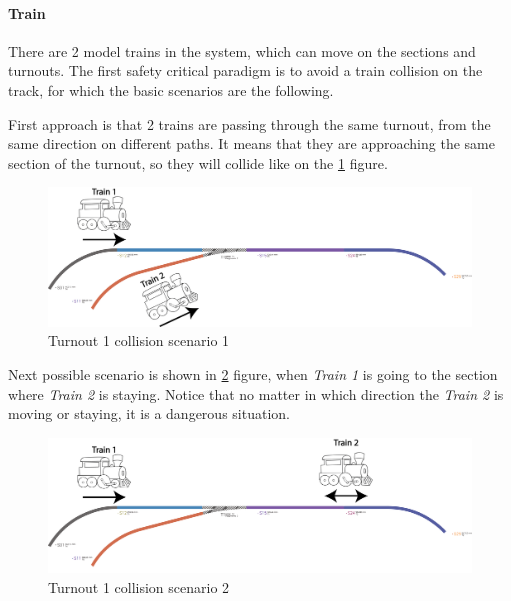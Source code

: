 \paragraph{Train} \label{par:trainScenarios}
There are 2 model trains in the system, which can move on the sections and turnouts. The first safety critical paradigm is to avoid a train collision on the track, for which the basic scenarios are the following. 


First approach is that 2 trains are passing through the same turnout, from the same direction on different paths. It means that they are approaching the same section of the turnout, so they will collide like on the \ref{fig:LayoutT1-scenario1} figure.
\begin{figure}[!h]
	\centering
	\includegraphics[width=150mm, keepaspectratio]{figures/modes3/layoutT1-scenario1.png}
	\caption{Turnout 1 collision scenario 1}
	\label{fig:LayoutT1-scenario1}
\end{figure}

Next possible scenario is shown in \ref{fig:LayoutT1-scenario2} figure, when \textit{Train 1} is going to the section where \textit{Train 2} is staying. Notice that no matter in which direction the \textit{Train 2} is moving or staying, it is a dangerous situation.
\begin{figure}[!h]
	\centering
	\includegraphics[width=150mm, keepaspectratio]{figures/modes3/layoutT1-scenario2.png}
	\caption{Turnout 1 collision scenario 2}
	\label{fig:LayoutT1-scenario2}
\end{figure}

